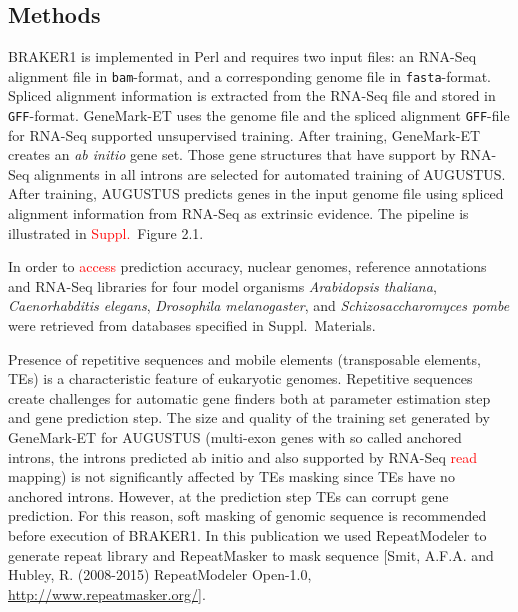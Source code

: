 \documentclass{bioinfo}
\begin{document}
\begin{methods}
\section{Methods}

BRAKER1 is implemented in Perl and requires two input files: an RNA-Seq alignment file in \texttt{bam}-format, and a corresponding genome file in \texttt{fasta}-format. Spliced alignment information is extracted from the RNA-Seq file and stored in \texttt{GFF}-format. GeneMark-ET uses the genome file and  the spliced alignment \texttt{GFF}-file for RNA-Seq supported unsupervised training. After training, GeneMark-ET creates an \textit{ab initio} gene set. Those gene structures that have support by RNA-Seq alignments in all introns are selected for automated training of AUGUSTUS. After training, AUGUSTUS predicts genes in the input genome file using spliced alignment information from RNA-Seq as extrinsic evidence. The pipeline is illustrated in \textcolor{red}{Suppl.~}Figure 2.1.




In order to \textcolor{red}{access} prediction accuracy, nuclear genomes, reference annotations and RNA-Seq libraries for four model organisms \textit{Arabidopsis thaliana}, \textit{Caenorhabditis elegans}, \textit{Drosophila melanogaster}, and \textit{Schizosaccharomyces pombe} were retrieved from databases specified in Suppl.~Materials.

Presence of repetitive sequences and mobile elements (transposable elements, TEs) is a characteristic feature of eukaryotic genomes. Repetitive sequences create challenges for automatic gene finders both at parameter estimation step and gene prediction step. The size and quality of the training set generated by GeneMark-ET for AUGUSTUS (multi-exon genes with so called anchored introns, the introns predicted ab initio and also supported by RNA-Seq \textcolor{red}{read} mapping) is not significantly affected by TEs masking since TEs have no anchored introns. However, at the prediction step TEs can corrupt gene prediction. For this reason, soft masking of genomic sequence is recommended before execution of BRAKER1. In this publication we used RepeatModeler to generate repeat library and RepeatMasker to mask sequence [Smit, A.F.A. and Hubley, R. (2008-2015) RepeatModeler Open-1.0, \url{http://www.repeatmasker.org/}].

\end{methods}
\end{document}
